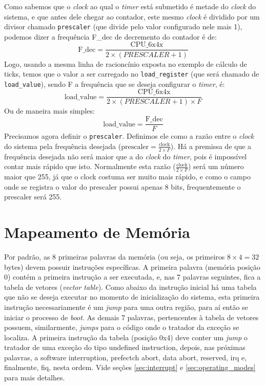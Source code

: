 Como sabemos que o \emph{clock} ao qual o \emph{timer} está submetido é metade do \emph{clock} do sistema, e que antes dele chegar ao contador, este mesmo \emph{clock} é dividido por um divisor chamado \verb+prescaler+ (que divide pelo valor configurado nele mais 1), podemos dizer a frequência F\_dec de decremento do contador é de:
\begin{equation}
	\text{F\_dec} = \frac{\text{CPU\_6x4x}}{2 \times (PRESCALER+1)}
\end{equation}
Logo, usando a mesma linha de racioncínio exposta no exemplo de cálculo de ticks, temos que o valor a ser carregado no \verb+load_register+ (que será chamado de \verb+load_value+), sendo F a frequência que se deseja configurar o \emph{timer}, é:
\begin{equation}
	\text{load\_value} = \frac{\text{CPU\_6x4x}}{2 \times (PRESCALER+1) \times F}
\end{equation}
Ou de maneira mais simples:
\begin{equation}
	\text{load\_value} = \frac{\text{F\_dec}}{F}
\end{equation}
Precisamos agora definir o \verb+prescaler+. Definimos ele como a razão entre o \emph{clock} do sistema pela frequência desejada ($\text{prescaler}=\frac{\text{clock}}{2 \times F}$). Há a premissa de que a frequência desejada não será maior que a do \emph{clock} do \emph{timer}, pois é impossível contar mais rápido que isto. Normalmente esta razão ($\frac{\text{clock}}{2 \times F}$) será um número maior que 255, já que o clock costuma ser muito mais rápido, e como o campo onde se registra o valor do prescaler possui apenas 8 bits, frequentemente o prescaler será 255.



\section{Mapeamento de Memória}

Por padrão, as 8 primeiras palavras da memória (ou seja, os primeiros $8 \times 4 = 32$ bytes) devem possuir instruções específicas. A primeira palavra (memória posição 0) contém a primeira instrução a ser executada, e, nas 7 palavras seguintes, fica a tabela de vetores (\emph{vector table}). Como abaixo da instrução inicial há uma tabela que não se deseja executar no momento de inicialização do sistema, esta primeira instrução necessariamente é um \emph{jump} para uma outra região, para aí então se iniciar o processo de \emph{boot}. 
As demais 7 palavras, pertencentes à tabela de vetores possuem, similarmente, \emph{jumps} para o código onde o tratador da exceção se localiza. A primeira instrução da tabela (posição 0x4) deve conter um \emph{jump} o tratador de uma exceção do tipo undefined instruction, depois, nas próximas palavras, a software interruption, prefectch abort, data abort, reserved, irq e, finalmente, fiq, nesta ordem. Vide seções \ref{sec:interrupt} e \ref{sec:operating_modes} para mais detalhes.


